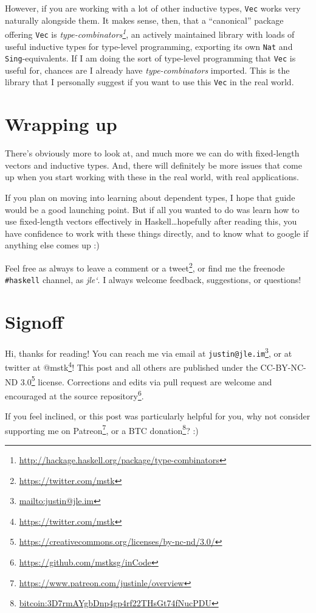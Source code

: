 \documentclass[]{article}
\renewcommand{\href}[2]{#2\footnote{\url{#1}}}
\begin{document}
However, if you are working with a lot of other inductive types, \texttt{Vec}
works very naturally alongside them. It makes sense, then, that a ``canonical''
package offering \texttt{Vec} is
\emph{\href{http://hackage.haskell.org/package/type-combinators}{type-combinators}},
an actively maintained library with loads of useful inductive types for
type-level programming, exporting its own \texttt{Nat} and
\texttt{Sing}-equivalents. If I am doing the sort of type-level programming that
\texttt{Vec} is useful for, chances are I already have \emph{type-combinators}
imported. This is the library that I personally suggest if you want to use this
\texttt{Vec} in the real world.

\section{Wrapping up}\label{wrapping-up}

There's obviously more to look at, and much more we can do with fixed-length
vectors and inductive types. And, there will definitely be more issues that come
up when you start working with these in the real world, with real applications.

If you plan on moving into learning about dependent types, I hope that guide
would be a good launching point. But if all you wanted to do was learn how to
use fixed-length vectors effectively in Haskell\ldots hopefully after reading
this, you have confidence to work with these things directly, and to know what
to google if anything else comes up :)

Feel free as always to leave a comment or a
\href{https://twitter.com/mstk}{tweet}, or find me the freenode
\texttt{\#haskell} channel, as \emph{jle`}. I always welcome feedback,
suggestions, or questions!

\section{Signoff}\label{signoff}

Hi, thanks for reading! You can reach me via email at
\href{mailto:justin@jle.im}{\nolinkurl{justin@jle.im}}, or at twitter at
\href{https://twitter.com/mstk}{@mstk}! This post and all others are published
under the \href{https://creativecommons.org/licenses/by-nc-nd/3.0/}{CC-BY-NC-ND
3.0} license. Corrections and edits via pull request are welcome and encouraged
at \href{https://github.com/mstksg/inCode}{the source repository}.

If you feel inclined, or this post was particularly helpful for you, why not
consider \href{https://www.patreon.com/justinle/overview}{supporting me on
Patreon}, or a \href{bitcoin:3D7rmAYgbDnp4gp4rf22THsGt74fNucPDU}{BTC donation}?
:)
\end{document}
